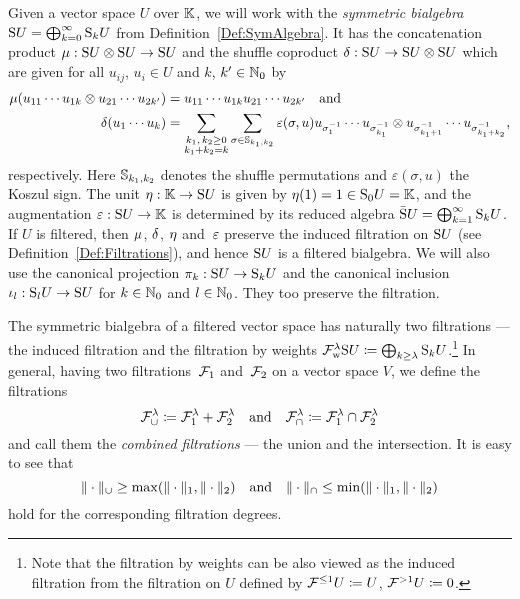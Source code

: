 \documentclass[\MainFolder/Text.tex]{subfiles}
\begin{document}
Given a vector space $U$ over $\mathbb{K}$, we will work with the \emph{symmetric bialgebra} $\mathrm{S} U = \bigoplus_{k=0}^\infty \mathrm{S}_k U$ from Definition~\ref{Def:SymAlgebra}. It has the concatenation product $\mu: \mathrm{S} U \otimes \mathrm{S} U \rightarrow \mathrm{S} U$ and the shuffle coproduct $\delta: \mathrm{S} U \rightarrow \mathrm{S} U \otimes \mathrm{S} U$ which are given for all $u_{ij}$, $u_i \in U$ and $k$, $k'\in \mathbb{N}_0$ by
\begin{align*}
\mu(u_{11}\dotsb u_{1k} \otimes u_{21} \dotsb u_{2k'}) &= u_{11} \dotsb u_{1k} u_{21} \dotsb u_{2k'}\quad \text{and}\\
\delta(u_1 \dotsb u_k) &= \sum_{\substack{k_1,\,k_2 \ge 0\\ k_1 + k_2 = k}} \sum_{\sigma\in \mathbb{S}_{k_1, k_2}} \varepsilon(\sigma,u) u_{\sigma^{-1}_1} \dotsb u_{\sigma_{k_1}^{-1}}\otimes u_{\sigma_{k_1+1}^{-1}}\dotsb u_{\sigma_{k_1 + k_2}^{-1}},
\end{align*}
respectively. Here $\mathbb{S}_{k_1,k_2}$ denotes the shuffle permutations and $\varepsilon(\sigma,u)$ the Koszul sign. The unit $\eta: \mathbb{K} \rightarrow \mathrm{S} U$ is given by $\eta(1) = 1 \in \mathrm{S}_0 U = \mathbb{K}$, and the augmentation $\varepsilon: \mathrm{S} U \rightarrow \mathbb{K}$ is determined by its reduced algebra $\bar{\mathrm{S}} U = \bigoplus_{k=1}^\infty \mathrm{S}_k U$. If $U$ is filtered, then $\mu$, $\delta$, $\eta$ and~$\varepsilon$ preserve the induced filtration on $\mathrm{S} U$ (see Definition~\ref{Def:Filtrations}), and hence $\mathrm{S} U$ is a filtered bialgebra. We will also use the canonical projection $\pi_k: \mathrm{S} U \rightarrow \mathrm{S}_k U$ and the canonical inclusion $\iota_l: \mathrm{S}_l U \rightarrow \mathrm{S} U$ for $k\in\mathbb{N}_0$ and $l\in \mathbb{N}_0$. They too preserve the filtration.

The symmetric bialgebra of a filtered vector space has naturally two filtrations --- the induced filtration and the filtration by weights $\mathcal{F}_{\mathrm{w}}^\lambda \mathrm{S} U \coloneqq \bigoplus_{k\ge \lambda} \mathrm{S}_k U$.\footnote{Note that the filtration by weights can be also viewed as the induced filtration from the filtration on $U$ defined by $\mathcal{F}^{\le 1}U \coloneqq U$, $\mathcal{F}^{>1}U\coloneqq 0$.} In general, having two filtrations~$\mathcal{F}_1$ and~$\mathcal{F}_2$ on a vector space $V$, we define the filtrations
\begin{equation}\label{Eq:CombinedFiltr}
\mathcal{F}_\cup^\lambda \coloneqq \mathcal{F}_1^\lambda + \mathcal{F}_2^\lambda\quad\text{and}\quad\mathcal{F}_\cap^{\lambda} \coloneqq \mathcal{F}_1^\lambda \cap \mathcal{F}_2^\lambda
\end{equation}
and call them the \emph{combined filtrations} --- the union and the intersection. It is easy to see that 
\[ \| \cdot \|_\cup \ge \max(\| \cdot \|_1,\| \cdot \|_{2})\quad\text{and}\quad\| \cdot \|_\cap \le \min(\| \cdot \|_1,\| \cdot \|_{2}) \]
hold for the corresponding filtration degrees.
\end{document}
